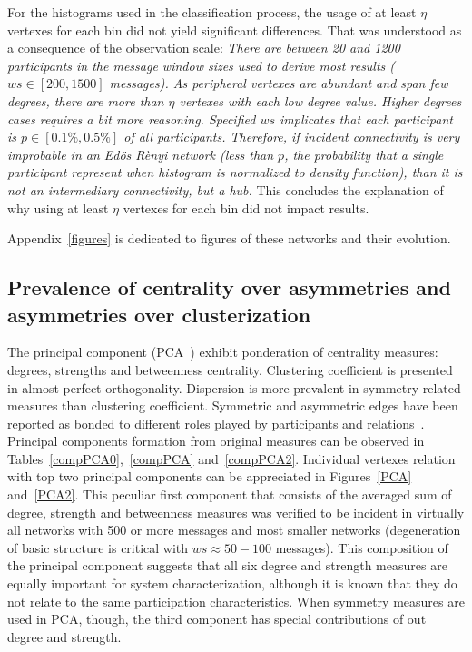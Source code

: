 \documentclass[%
 aip,
 jmp,%
 amsmath,amssymb,
 reprint,%
]{revtex4-1}
\begin{document}
For the histograms used in the classification process, the usage of at least $\eta$ vertexes for each bin did not yield significant differences.
That was understood as a consequence of the observation scale:
\emph{There are between 20 and 1200 participants in the message window sizes used to derive most results ($ws \in [200,1500]$ messages). As peripheral vertexes are abundant and span few degrees, there are more than $\eta$ vertexes with each low degree value. Higher degrees cases requires a bit more reasoning. Specified $ws$ implicates that each participant is $p \in [0.1\%,0.5\%]$ of all participants. Therefore, if incident connectivity is very improbable in an Ed\"os R\`enyi network (less than $p$, the probability that a single participant represent when histogram is normalized to density function), than it is not an intermediary connectivity, but a hub.} This concludes the explanation of why using at least $\eta$ vertexes for each bin did not impact results.

Appendix~\ref{figures} is dedicated to figures of these networks and their evolution.

    \subsection{Prevalence of centrality over asymmetries and asymmetries over clusterization}\label{prevalence}

The principal component (PCA~\cite{pca}) exhibit ponderation of centrality measures: degrees, strengths and betweenness centrality. Clustering coefficient is presented in almost perfect orthogonality. Dispersion is more prevalent in symmetry related measures than clustering coefficient. Symmetric and asymmetric edges have been reported as bonded to different roles played by participants and relations~\cite{newmanEvolving}. Principal components formation from original measures can be observed in Tables~\ref{compPCA0},~\ref{compPCA} and~\ref{compPCA2}. Individual vertexes relation with top two principal components can be appreciated in Figures~\ref{PCA} and~\ref{PCA2}.
This peculiar first component that consists of the averaged sum of degree, strength and betweenness measures was verified to be incident in virtually all networks with 500 or more messages and most smaller networks (degeneration of basic structure is critical with $ws \approx 50-100$ messages). This composition of the principal component suggests that all six degree and strength measures are equally important for system characterization, although it is known that they do not relate to the same participation characteristics. When symmetry measures are used in PCA, though, the third component has special contributions of out degree and strength.
\end{document}

